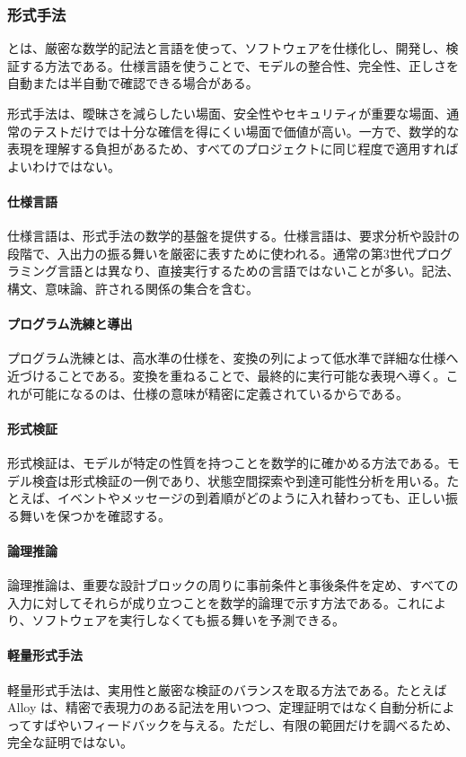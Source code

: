 \documentclass[a4paper,11pt]{ltjsarticle}
\numberwithin{figure}{section}
\numberwithin{table}{section}
\begin{document}
\subsubsection{形式手法}
とは、厳密な数学的記法と言語を使って、ソフトウェアを仕様化し、開発し、検証する方法である。仕様言語を使うことで、モデルの整合性、完全性、正しさを自動または半自動で確認できる場合がある。

形式手法は、曖昧さを減らしたい場面、安全性やセキュリティが重要な場面、通常のテストだけでは十分な確信を得にくい場面で価値が高い。一方で、数学的な表現を理解する負担があるため、すべてのプロジェクトに同じ程度で適用すればよいわけではない。

\paragraph{仕様言語}
仕様言語は、形式手法の数学的基盤を提供する。仕様言語は、要求分析や設計の段階で、入出力の振る舞いを厳密に表すために使われる。通常の第3世代プログラミング言語とは異なり、直接実行するための言語ではないことが多い。記法、構文、意味論、許される関係の集合を含む。

\paragraph{プログラム洗練と導出}
プログラム洗練とは、高水準の仕様を、変換の列によって低水準で詳細な仕様へ近づけることである。変換を重ねることで、最終的に実行可能な表現へ導く。これが可能になるのは、仕様の意味が精密に定義されているからである。

\paragraph{形式検証}
形式検証は、モデルが特定の性質を持つことを数学的に確かめる方法である。モデル検査は形式検証の一例であり、状態空間探索や到達可能性分析を用いる。たとえば、イベントやメッセージの到着順がどのように入れ替わっても、正しい振る舞いを保つかを確認する。

\paragraph{論理推論}
論理推論は、重要な設計ブロックの周りに事前条件と事後条件を定め、すべての入力に対してそれらが成り立つことを数学的論理で示す方法である。これにより、ソフトウェアを実行しなくても振る舞いを予測できる。

\paragraph{軽量形式手法}
軽量形式手法は、実用性と厳密な検証のバランスを取る方法である。たとえば Alloy は、精密で表現力のある記法を用いつつ、定理証明ではなく自動分析によってすばやいフィードバックを与える。ただし、有限の範囲だけを調べるため、完全な証明ではない。
\end{document}
